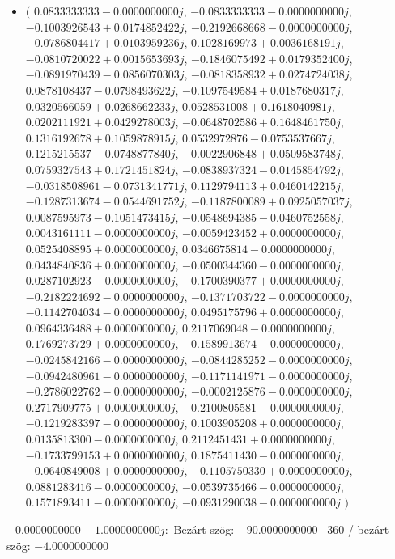 \documentclass[14pt,a4paper]{article}
\begin{document}
\begin{itemize}
\item
$\big($
$0.0833333333-0.0000000000j$, $-0.0833333333-0.0000000000j$, $-0.1003926543+0.0174852422j$, $-0.2192668668-0.0000000000j$, $-0.0786804417+0.0103959236j$, $0.1028169973+0.0036168191j$, $-0.0810720022+0.0015653693j$, $-0.1846075492+0.0179352400j$, $-0.0891970439-0.0856070303j$, $-0.0818358932+0.0274724038j$, $0.0878108437-0.0798493622j$, $-0.1097549584+0.0187680317j$, $0.0320566059+0.0268662233j$, $0.0528531008+0.1618040981j$, $0.0202111921+0.0429278003j$, $-0.0648702586+0.1648461750j$, $0.1316192678+0.1059878915j$, $0.0532972876-0.0753537667j$, $0.1215215537-0.0748877840j$, $-0.0022906848+0.0509583748j$, $0.0759327543+0.1721451824j$, $-0.0838937324-0.0145854792j$, $-0.0318508961-0.0731341771j$, $0.1129794113+0.0460142215j$, $-0.1287313674-0.0544691752j$, $-0.1187800089+0.0925057037j$, $0.0087595973-0.1051473415j$, $-0.0548694385-0.0460752558j$, $0.0043161111-0.0000000000j$, $-0.0059423452+0.0000000000j$, $0.0525408895+0.0000000000j$, $0.0346675814-0.0000000000j$, $0.0434840836+0.0000000000j$, $-0.0500344360-0.0000000000j$, $0.0287102923-0.0000000000j$, $-0.1700390377+0.0000000000j$, $-0.2182224692-0.0000000000j$, $-0.1371703722-0.0000000000j$, $-0.1142704034-0.0000000000j$, $0.0495175796+0.0000000000j$, $0.0964336488+0.0000000000j$, $0.2117069048-0.0000000000j$, $0.1769273729+0.0000000000j$, $-0.1589913674-0.0000000000j$, $-0.0245842166-0.0000000000j$, $-0.0844285252-0.0000000000j$, $-0.0942480961-0.0000000000j$, $-0.1171141971-0.0000000000j$, $-0.2786022762-0.0000000000j$, $-0.0002125876-0.0000000000j$, $0.2717909775+0.0000000000j$, $-0.2100805581-0.0000000000j$, $-0.1219283397-0.0000000000j$, $0.1003905208+0.0000000000j$, $0.0135813300-0.0000000000j$, $0.2112451431+0.0000000000j$, $-0.1733799153+0.0000000000j$, $0.1875411430-0.0000000000j$, $-0.0640849008+0.0000000000j$, $-0.1105750330+0.0000000000j$, $0.0881283416-0.0000000000j$, $-0.0539735466-0.0000000000j$, $0.1571893411-0.0000000000j$, $-0.0931290038-0.0000000000j$
$\big)$
\end{itemize}
$-0.0000000000-1.0000000000j$:\
Bezárt szög: $-90.0000000000$ \
360 / bezárt szög: $-4.0000000000$\
\end{document}
